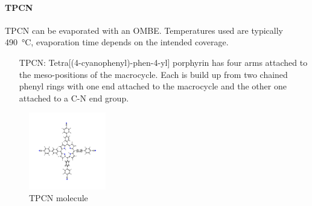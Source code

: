 \paragraph{TPCN}
TPCN can be evaporated with an OMBE. Temperatures used are typically \SI{490}{\celsius}, evaporation time depends on the intended coverage. 
\begin{itemize}
	\item [TPCN:] Tetra[(4-cyanophenyl)-phen-4-yl] porphyrin has four arms attached to the meso-positions of the macrocycle. Each is build up from two chained phenyl rings with one end attached to the macrocycle and the other one attached to a C-N end group.
\end{itemize}

\begin{figure}[]
	\centering
	\includegraphics[width=0.3\textwidth]{./images/molecules/TPCN}
	\caption{TPCN molecule}
	\label{fig:TPCN}
\end{figure}
